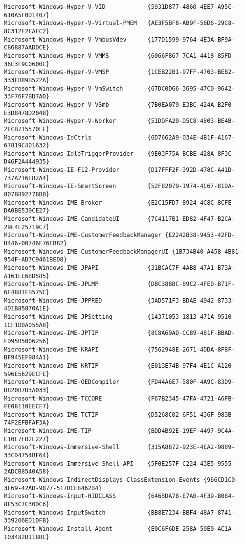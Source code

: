 \documentclass{report}
\begin{document}
\begin{lstlisting}[breaklines=true,basicstyle=\tiny]
Microsoft-Windows-Hyper-V-VID            {5931D877-4860-4EE7-A95C-610A5F0D1407}
Microsoft-Windows-Hyper-V-Virtual-PMEM   {AE3F5BF8-AB9F-56D6-29C8-8C312E2FAEC2}
Microsoft-Windows-Hyper-V-VmbusVdev      {177D1599-9764-4E3A-BF9A-C86887AADDCE}
Microsoft-Windows-Hyper-V-VMMS           {6066F867-7CA1-4418-85FD-36E3F9C0600C}
Microsoft-Windows-Hyper-V-VMSP           {1CEB22B1-97FF-4703-BEB2-333EB89B522A}
Microsoft-Windows-Hyper-V-VmSwitch       {67DC0D66-3695-47C0-9642-33F76F7BD7AD}
Microsoft-Windows-Hyper-V-VSmb           {7B0EA079-E3BC-424A-B2F0-E3D8478D204B}
Microsoft-Windows-Hyper-V-Worker         {51DDFA29-D5C8-4803-BE4B-2ECB715570FE}
Microsoft-Windows-IdCtrls                {6D7662A9-034E-4B1F-A167-67819C401632}
Microsoft-Windows-IdleTriggerProvider    {9E03F75A-BCBE-428A-8F3C-D46F2A444935}
Microsoft-Windows-IE-F12-Provider        {D17FFF2F-392D-478C-A41D-737A216EB2A4}
Microsoft-Windows-IE-SmartScreen         {52F82079-1974-4C67-81DA-807B892778BB}
Microsoft-Windows-IME-Broker             {E2C15FD7-8924-4C8C-8CFE-DA0BE539CE27}
Microsoft-Windows-IME-CandidateUI        {7C4117B1-ED82-4F47-B2CA-29E4E25719C7}
Microsoft-Windows-IME-CustomerFeedbackManager {E2242B38-9453-42FD-B446-00746E76EB82}
Microsoft-Windows-IME-CustomerFeedbackManagerUI {1B734B40-A458-4B81-954F-AD7C9461BED8}
Microsoft-Windows-IME-JPAPI              {31BCAC7F-4AB8-47A1-B73A-A161EE68D585}
Microsoft-Windows-IME-JPLMP              {DBC388BC-89C2-4FE0-B71F-6E4881FB575C}
Microsoft-Windows-IME-JPPRED             {3AD571F3-BDAE-4942-8733-4D1B85870A1E}
Microsoft-Windows-IME-JPSetting          {14371053-1813-471A-9510-1CF1D0A055A8}
Microsoft-Windows-IME-JPTIP              {8C8A69AD-CC89-481F-BBAD-FD95B5006256}
Microsoft-Windows-IME-KRAPI              {7562948E-2671-4DDA-8F8F-BF945EF984A1}
Microsoft-Windows-IME-KRTIP              {E013E74B-97F4-4E1C-A120-596E5629ECFE}
Microsoft-Windows-IME-OEDCompiler        {FD44A6E7-580F-4A9C-83D9-D820B7D3A033}
Microsoft-Windows-IME-TCCORE             {F67B2345-47FA-4721-A6FB-FE08110EECF7}
Microsoft-Windows-IME-TCTIP              {D5268C02-6F51-436F-983B-74F2EFBFAF3A}
Microsoft-Windows-IME-TIP                {BDD4B92E-19EF-4497-9C4A-E10E7FD2E227}
Microsoft-Windows-Immersive-Shell        {315A8872-923E-4EA2-9889-33CD4754BF64}
Microsoft-Windows-Immersive-Shell-API    {5F0E257F-C224-43E5-9555-2ADCB8540A58}
Microsoft-Windows-IndirectDisplays-ClassExtension-Events {966CD1C0-3F69-42AD-9877-517DCE8462B4}
Microsoft-Windows-Input-HIDCLASS         {6465DA78-E7A0-4F39-B084-8F53C7C30DC6}
Microsoft-Windows-InputSwitch            {BB8E7234-BBF4-48A7-8741-339206ED1DFB}
Microsoft-Windows-Install-Agent          {E0C6F6DE-258A-50E0-AC1A-103482D118BC}

\end{lstlisting}
\end{document}
